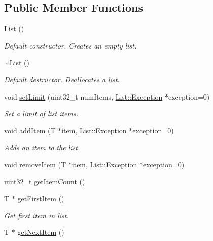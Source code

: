 \subsection*{Public Member Functions}
\begin{DoxyCompactItemize}
\item 
\hyperlink{class_list_a5c5e27671b21b3815d4e25b953c69454}{List} ()
\begin{DoxyCompactList}\small\item\em Default constructor. Creates an empty list. \end{DoxyCompactList}\item 
\hyperlink{class_list_a2b58189090f6e5ce52939c9195e59e85}{$\sim$\-List} ()
\begin{DoxyCompactList}\small\item\em Default destructor. Deallocates a list. \end{DoxyCompactList}\item 
void \hyperlink{class_list_ac7e7391644096d503dcbc671cf6fa294}{set\-Limit} (uint32\-\_\-t num\-Items, \hyperlink{class_list_af1ab8d5d6d02ed4b4034247619c7119e}{List\-::\-Exception} $\ast$exception=0)
\begin{DoxyCompactList}\small\item\em Set a limit of list items. \end{DoxyCompactList}\item 
void \hyperlink{class_list_aee7775c7e6c81d80ab3af32fcfa9e74c}{add\-Item} (T $\ast$item, \hyperlink{class_list_af1ab8d5d6d02ed4b4034247619c7119e}{List\-::\-Exception} $\ast$exception=0)
\begin{DoxyCompactList}\small\item\em Adds an item to the list. \end{DoxyCompactList}\item 
void \hyperlink{class_list_a4caad9581b0a2011e345603de01105d9}{remove\-Item} (T $\ast$item, \hyperlink{class_list_af1ab8d5d6d02ed4b4034247619c7119e}{List\-::\-Exception} $\ast$exception=0)
\item 
uint32\-\_\-t \hyperlink{class_list_abfd42398634ed15af32a53ee729178da}{get\-Item\-Count} ()
\item 
T $\ast$ \hyperlink{class_list_a7cd6189f8986c21de7069dc9b6410409}{get\-First\-Item} ()
\begin{DoxyCompactList}\small\item\em Get first item in list. \end{DoxyCompactList}\item 
T $\ast$ \hyperlink{class_list_a40145d5d6700cc058fd3fd2745ca0169}{get\-Next\-Item} ()

\end{DoxyCompactItemize}
